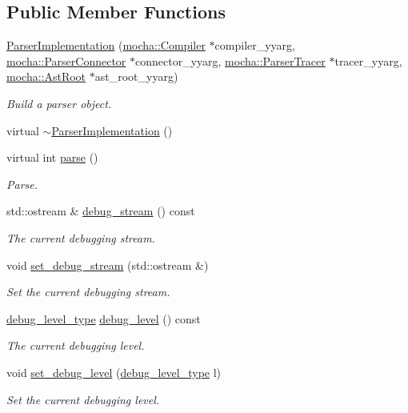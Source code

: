 \subsection*{Public Member Functions}
\begin{DoxyCompactItemize}
\item 
\hyperlink{classyy_1_1_parser_implementation_acaa01bddfccf796c40922b36d6ff4c70}{ParserImplementation} (\hyperlink{classmocha_1_1_compiler}{mocha::Compiler} $\ast$compiler\_\-yyarg, \hyperlink{classmocha_1_1_parser_connector}{mocha::ParserConnector} $\ast$connector\_\-yyarg, \hyperlink{classmocha_1_1_parser_tracer}{mocha::ParserTracer} $\ast$tracer\_\-yyarg, \hyperlink{classmocha_1_1_ast_root}{mocha::AstRoot} $\ast$ast\_\-root\_\-yyarg)
\begin{DoxyCompactList}\small\item\em Build a parser object. \end{DoxyCompactList}\item 
virtual \hyperlink{classyy_1_1_parser_implementation_abfde9ffe9956336376229533eb9d1979}{$\sim$ParserImplementation} ()
\item 
virtual int \hyperlink{classyy_1_1_parser_implementation_a17dfd513ee68d4cf7679e1b492e6274e}{parse} ()
\begin{DoxyCompactList}\small\item\em Parse. \end{DoxyCompactList}\item 
std::ostream \& \hyperlink{classyy_1_1_parser_implementation_a27686396ccd5c6c4201d10a438b6435a}{debug\_\-stream} () const 
\begin{DoxyCompactList}\small\item\em The current debugging stream. \end{DoxyCompactList}\item 
void \hyperlink{classyy_1_1_parser_implementation_a8c3e371e8b312f1fd4267b73984ca290}{set\_\-debug\_\-stream} (std::ostream \&)
\begin{DoxyCompactList}\small\item\em Set the current debugging stream. \end{DoxyCompactList}\item 
\hyperlink{classyy_1_1_parser_implementation_a3bc045d9c5422457dac380fd02718406}{debug\_\-level\_\-type} \hyperlink{classyy_1_1_parser_implementation_add459e6a200ea024c2eced08cd8b9483}{debug\_\-level} () const 
\begin{DoxyCompactList}\small\item\em The current debugging level. \end{DoxyCompactList}\item 
void \hyperlink{classyy_1_1_parser_implementation_aff4c6b0e297b670c0c7ec1ea8168d605}{set\_\-debug\_\-level} (\hyperlink{classyy_1_1_parser_implementation_a3bc045d9c5422457dac380fd02718406}{debug\_\-level\_\-type} l)
\begin{DoxyCompactList}\small\item\em Set the current debugging level. \end{DoxyCompactList}\end{DoxyCompactItemize}
